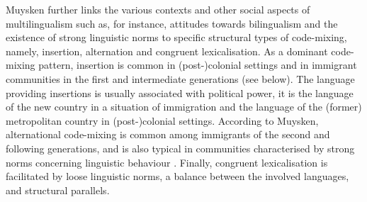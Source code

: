 Muysken further links the various contexts and other social aspects of multilingualism such as, for instance, attitudes towards bilingualism and the existence of strong linguistic norms to specific structural types of code-mixing, namely, insertion, alternation and congruent lexicalisation. As a dominant code-mixing pattern, insertion is common in (post-)colonial settings and in immigrant communities in the first and intermediate generations (see below). The language providing insertions is usually associated with political power, it is the language of the new country in a situation of immigration and the language of the (former) metropolitan country in (post-)colonial settings. According to Muysken, alternational code-mixing is common among immigrants of the second and following generations, and is also typical in communities characterised by strong norms concerning linguistic behaviour \citep[][249]{muysken-bilingual-2000}. Finally, congruent lexicalisation is facilitated by loose linguistic norms, a balance between the involved languages, and structural parallels.

